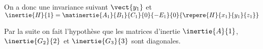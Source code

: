 \ifprof
\begin{corrige}
On a donc une invariance suivant $\vect{y_1}$ et 
$\inertie{H}{1}=\matinertie{A_1}{B_1}{C_1}{0}{-E_1}{0}{\repere{H}{x_1}{y_1}{z_1}}$
\end{corrige}
\else
\fi

%


Par la suite on fait l'hypothèse que les matrices d'inertie $\inertie{A}{1}$, $\inertie{G_2}{2}$ et $\inertie{G_3}{3}$ sont diagonales. 

